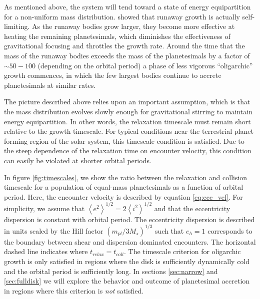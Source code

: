 \documentclass[twocolumn]{aastex63}
\begin{document}
As mentioned above, the system will tend toward a state of energy
equipartition for a non-uniform mass distribution. \citet{kokubo98}
showed that runaway growth is actually self-limiting. As the runaway
bodies grow larger, they become more effective at heating the
remaining planetesimals, which diminishes the effectiveness of
gravitational focusing and throttles the growth rate. Around the time
that the mass of the runaway bodies exceeds the mass of the planetesimals
by a factor of $\sim 50-100$ (depending on the orbital period)
\citep{ida93} a phase of less vigorous ``oligarchic'' 
growth commences, in which the few largest bodies continue to 
accrete planetesimals at similar rates.

The picture described above relies upon an important assumption, which
is that the mass distribution evolves slowly enough for gravitational stirring to maintain energy equipartition. In other words, the relaxation timescale must remain short relative to the growth timescale. For typical conditions near the terrestrial planet forming region of the solar system, this timescale condition is satisfied. Due to the steep dependence of the relaxation time on encounter velocity, this condition can easily be violated at shorter orbital periods.

In figure \ref{fig:timescales}, we show the ratio between the relaxation
and collision timescale for a population of equal-mass planetesimals
as a function of orbital period. Here, the encounter velocity is
described by equation \ref{eq:ecc_vel}. For
simplicity, we assume that $\left< e^2 \right>^{1/2} = 2\left< i^2
\right>^{1/2}$ \citep{ida93a} and that the eccentricity dispersion is
constant with orbital period. The eccentricity dispersion is described
in units scaled by the Hill factor $\left( m_{pl}/ 3 M_{\star}
\right)^{1/3}$ such that $e_{h} = 1$ corresponds to the boundary
between shear and dispersion dominated encounters. The horizontal
dashed line indicates where $t_{relax} = t_{coll}$. The timescale
criterion for oligarchic growth is only satisfied in regions where the
disk is sufficiently dynamically cold and the orbital period is
sufficiently long. In sections \ref{sec:narrow} and \ref{sec:fulldisk}
we will explore the behavior and outcome of planetesimal accretion in regions where this criterion is \textit{not} satisfied. 
\end{document}
